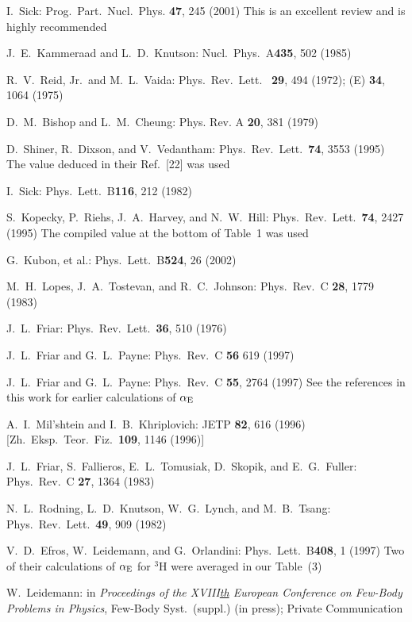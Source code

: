 \documentclass{svmult}
\begin{document}
\begin{thebibliography}{999}
 I.\ Sick: Prog.\ Part.\ Nucl.\ Phys. {\bf 47}, 245 (2001) This 
is an excellent review and is highly recommended

 J.\ E.\ Kammeraad and L.\ D.\ Knutson: Nucl.\ Phys.\ 
A{\bf 435}, 502 (1985)

 R.\ V.\ Reid, Jr.\ and M.\ L.\ Vaida: Phys.\ Rev.\ Lett.\ {\bf 
29}, 494 (1972); (E) {\bf 34}, 1064 (1975)

 D.\ M.\ Bishop and L.\ M.\ Cheung: Phys. Rev. A {\bf 20},
381 (1979)

 D.\ Shiner, R.\ Dixson, and V.\ Vedantham: 
Phys.\ Rev.\ Lett.\ {\bf 74}, 3553 (1995) The value deduced in their Ref.~[22]
was used

 I.\ Sick: Phys.\ Lett.\ B{\bf 116}, 212 (1982)

 S.\ Kopecky, P.\ Riehs, J.\ A.\ Harvey, and N.\ W.\ Hill:
Phys.\ Rev.\ Lett.\ {\bf 74}, 2427 (1995) The compiled value at the 
bottom of Table~1 was used

  G.\ Kubon, et al.: Phys.\ Lett.\ B{\bf 524}, 26 (2002)

 M.\ H.\ Lopes, J.\ A.\ Tostevan, and R.\ C.\ Johnson:
Phys.\ Rev.\ C {\bf 28}, 1779 (1983)

 J.\ L.\ Friar: Phys.\ Rev.\ Lett.\ {\bf 36}, 510 (1976)

 J.\ L.\ Friar and G.\ L.\ Payne: Phys.\ Rev.\ C {\bf 56}
619 (1997)

 J.\ L.\ Friar and G.\ L.\ Payne:  Phys.\ Rev.\ C {\bf 55}, 2764
(1997) See the references in this work for earlier calculations of 
$\alpha_{\rm E}$

 A.\ I.\ Mil'shtein and I.\ B.\ Khriplovich: JETP {\bf 82}, 616 
(1996) [Zh.\ Eksp.\ Teor.\ Fiz.\ {\bf 109}, 1146 (1996)]

 J.\ L.\ Friar, S.\ Fallieros, E.\ L.\ Tomusiak, D.\ Skopik, 
and E.\ G.\ Fuller: Phys.\ Rev.\ C {\bf 27}, 1364 (1983)

 N.\ L.\ Rodning, L.\ D.\ Knutson, W.\ G.\ Lynch, and 
M.\ B.\ Tsang: Phys.\ Rev.\ Lett.\ {\bf 49}, 909 (1982)

 V.\ D.\ Efros, W.\ Leidemann, and G.\ Orlandini: Phys.\ Lett.\ 
B{\bf 408}, 1 (1997) Two of their calculations of $\alpha_{\rm E}$ for $^3$H 
were averaged in our Table~(3)

 W.\ Leidemann: in {\it Proceedings of the XVIII\underline{th} 
European Conference on Few-Body Problems in Physics}, Few-Body Syst.\ (suppl.)
(in press); Private Communication


\end{thebibliography}
\end{document}
